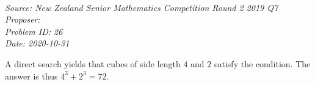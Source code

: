 \SSbreak\\
\emph{Source: New Zealand Senior Mathematics Competition Round 2 2019 Q7}\\
\emph{Proposer: \Pbrain}\\
\emph{Problem ID: 26}\\
\emph{Date: 2020-10-31}\\
\SSbreak

\bigskip 

\begin{solution}\hfil\medskip 

    A direct search yields that cubes of side length $4$ and $2$ satisfy the condition. The answer is thus $4^3 + 2^3 = \boxed{72}$.
\end{solution}\bigskip